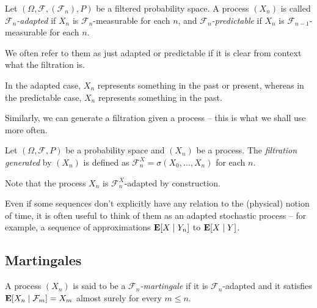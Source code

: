 \begin{definition}
	Let $(\Omega,\mathcal{F},(\mathcal{F}_n),P)$ be a filtered probability space. A process $(X_n)$ is called \textit{$\mathcal{F}_n$-adapted} if $X_n$ is $\mathcal{F}_n$-measurable for each $n$, and \textit{$\mathcal{F}_n$-predictable} if $X_n$ is $\mathcal{F}_{n-1}$-measurable for each $n$.
\end{definition}

We often refer to them as just adapted or predictable if it is clear from context what the filtration is.

In the adapted case, $X_n$ represents something in the past or present, whereas in the predictable case, $X_n$ represents something in the past.

Similarly, we can generate a filtration given a process -- this is what we shall use more often.

\begin{definition}
	Let $(\Omega,\mathcal{F},P)$ be a probability space and $(X_n)$ be a process. The \textit{filtration generated} by $(X_n)$ is defined as $\mathcal{F}_n^X=\sigma(X_0,\ldots,X_n)$ for each $n$.
\end{definition}
Note that the process $X_n$ is $\mathcal{F}_n^X$-adapted by construction.

Even if some sequences don't explicitly have any relation to the (physical) notion of time, it is often useful to think of them as an adapted stochastic process -- for example, a sequence of approximations $\textbf{E}[X\mid Y_n]$ to $\textbf{E}[X\mid Y]$.

\subsection{Martingales}

\begin{fdef}
	A process $(X_n)$ is said to be a \textit{$\mathcal{F}_n$-martingale} if it is $\mathcal{F}_n$-adapted and it satisfies $\textbf{E}[X_n\mid\mathcal{F}_m] = X_m$ almost surely for every $m\leq n$.
\end{fdef}

